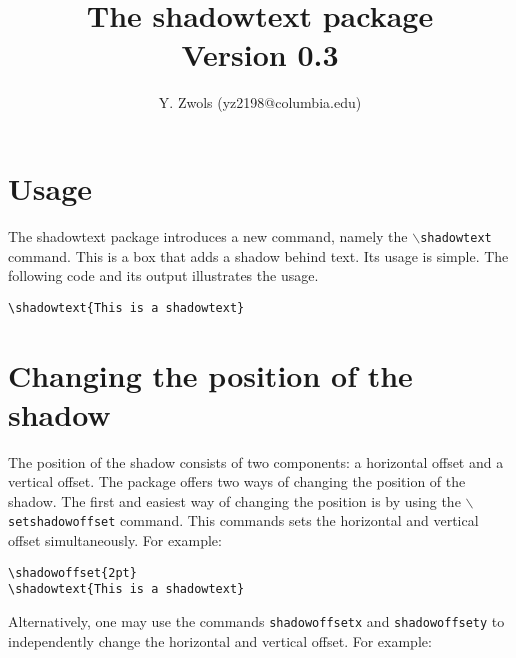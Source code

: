 \documentclass{article}
\begin{document}
\title{\bf The shadowtext package \\ \bigskip \normalfont\small Version 0.3}
\author{Y. Zwols (yz2198@columbia.edu)}
\maketitle

\shadowoffset{1pt}
\parindent=0pt
\parskip=8pt

\section{Usage}
The shadowtext package introduces a new command, namely the {\tt $\backslash$shadowtext} command. This is a box
that adds a shadow behind text. Its usage is simple. The following code and its output illustrates the usage. 

\begin{minipage}{\textwidth}
\begin{multicols*}{2} 
{\footnotesize
\begin{verbatim}
\shadowtext{This is a shadowtext}
\end{verbatim}}

\end{multicols*}
\end{minipage}

\section{Changing the position of the shadow}
The position of the shadow consists of two components: a horizontal offset and a vertical offset. 
The package offers two ways of changing the position of the shadow. The first and easiest way of 
changing the position is by using the {\tt $\backslash$setshadowoffset} command. This commands
sets the horizontal and vertical offset simultaneously. For example:

\begin{minipage}{\textwidth}
\begin{multicols*}{2} 
{\footnotesize
\begin{verbatim}
\shadowoffset{2pt}
\shadowtext{This is a shadowtext}
\end{verbatim}}

\shadowoffset{2pt}
\end{multicols*}
\end{minipage}

Alternatively, one may use the commands {\tt shadowoffsetx} and {\tt shadowoffsety} to independently change
the horizontal and vertical offset. For example:
\end{document}
